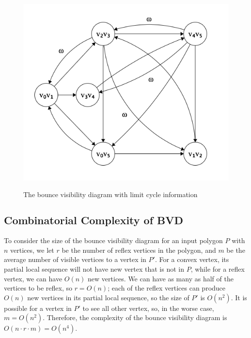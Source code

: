 \documentclass[letterpaper, 10 pt, conference]{ieeeconf}  %
\begin{document}
\begin{figure}
{\includegraphics[width=0.8\linewidth]{images/limit_cycle_graph.png}
\label{fig:limit_cycle_diagram}
}
\caption{The bounce visibility diagram with limit cycle information}
\label{fig:limit_cycle_bvd}
\end{figure}

\subsection{Combinatorial Complexity of BVD}

To consider the size of the bounce visibility diagram for an input polygon $P$ with $n$ vertices, we let $r$ be the number of reflex vertices in the polygon, and $m$ be the average number of visible vertices to a vertex in $P'$. For a convex vertex, its partial local sequence will not have new vertex that is not in $P$, while for a reflex vertex, we can have $O(n)$ new vertices. We can have as many as half of the vertices to be reflex, so $r = O(n)$; each of the reflex vertices can produce $O(n)$ new vertices in its partial local sequence, so the size of $P'$ is $O(n^2)$. It is possible for a vertex in $P'$ to see all other vertex, so, in the worse case, $m = O(n^2)$. Therefore, the complexity of the bounce visibility diagram is $O(n\cdot r\cdot m) = O(n^4)$. 
\end{document}
